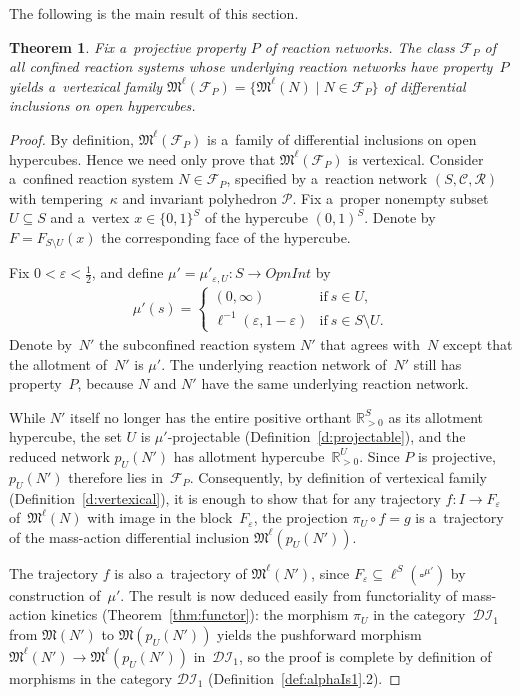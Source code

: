 \documentclass[pdftex]{sigma}
\newtheorem{Theorem}{Theorem}[section]
\begin{document}
The following is the main result of this section.
\begin{Theorem}
\label{t:proj-vertexical}
Fix a~projective property $P$ of reaction networks.
The class $\mathcal F_P$ of all confined reaction systems whose underlying reaction networks have property~$P$ yields
a~vertexical family $\mathfrak M^\ell(\mathcal F_P)=\big\{\mathfrak M^\ell(N)\mid N\in\mathcal F_P\big\}$ of
differential inclusions on open hypercubes.
\end{Theorem}
\begin{proof}
By def\/inition, $\mathfrak M^\ell(\mathcal F_P)$ is a~family of dif\/ferential inclusions on open hypercubes.
Hence we need only prove that $\mathfrak M^\ell(\mathcal F_P)$ is vertexical.
Consider a~{conf\/ined} reaction system $N\in\mathcal F_P$, specif\/ied by a~reaction network $(S,\mathcal C,\mathcal
R)$ with tempering~$\kappa$ and invariant polyhedron  $\mathcal P$.
Fix a~proper nonempty subset $U\subseteq S$ and a~vertex $x\in\{0,1\}^S$ of the hypercube $(0,1)^S$.
Denote by $F=F_{S\setminus U}(x)$ the corresponding face of the hypercube.

Fix $0<\varepsilon<\frac12$, and def\/ine $\mu'=\mu'_{\varepsilon,U}:S\to\mathit{OpnInt}$ by
\begin{gather*}
\mu'(s) =
\begin{cases} (0,\infty)&\text{if}~s\in U,
\\
\ell^{-1}(\varepsilon,1-\varepsilon)&\text{if}~s\in S\setminus U.
\end{cases}
\end{gather*}
Denote by~$N'$ the {subconf\/ined} reaction system $N'$ that agrees with~$N$ except that the allotment of~$N'$ is
$\mu'$.
The underlying reaction network of~$N'$ still has property~$P$, because $N$ and $N'$ have the same underlying reaction
network.

While $N'$ itself no longer has the entire positive orthant $\mathbb{R}_{>0}^S$ as its allotment hypercube, the set $U$
is $\mu'$-projectable (Def\/inition~\ref{d:projectable}), and the reduced network $p_U(N')$ has allotment
hypercube~$\mathbb{R}_{>0}^U$.
Since $P$ is projective, $p_U(N')$ therefore lies in~$\mathcal F_P$.
Consequently, by def\/inition of vertexical family (Def\/inition~\ref{d:vertexical}), it is enough to show that for any
trajectory $f:I\to F_\varepsilon$ of~$\mathfrak M^\ell(N)$ with image in the block~$F_\varepsilon$, the projection
$\pi_U\circ f=g$ is a~trajectory of the mass-action dif\/ferential inclusion $\mathfrak M^\ell(p_U(N'))$.

The trajectory $f$ is also a~trajectory of $\mathfrak M^\ell(N')$, since $F_\varepsilon\subseteq\ell^S(\square^{\mu'})$
by construction of~$\mu'$.
The result is now deduced easily from functoriality of mass-action kinetics (Theorem~\ref{thm:functor}): the morphism
$\pi_U$ in the category~$\mathcal{DI}_1$ from $\mathfrak M(N')$ to $\mathfrak M(p_U(N'))$ yields the pushforward
morphism $\mathfrak M^\ell(N')\to\mathfrak M^\ell(p_U(N'))$ in~$\mathcal{DI}_1$, so the proof is complete by
def\/inition of morphisms in the category $\mathcal{DI}_1$ (Def\/inition~\ref{def:alphaIs1}.2).
\end{proof}
\end{document}
